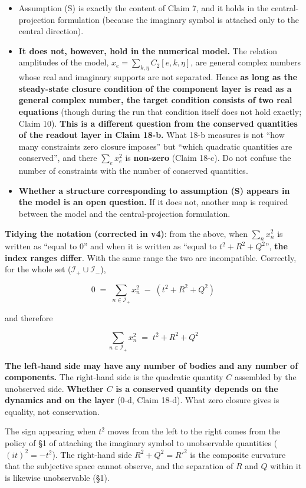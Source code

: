 \documentclass[
  10pt,
]{article}
\providecommand{\tightlist}{%
  \setlength{\itemsep}{0pt}\setlength{\parskip}{0pt}}
\begin{document}
\begin{itemize}
\tightlist
\item
  Assumption (S) is exactly the content of Claim 7, and it holds in the
  central-projection formulation (because the imaginary symbol is
  attached only to the central direction).
\item
  \textbf{It does not, however, hold in the numerical model.} The
  relation amplitudes of the model,
  \(x_e = \sum_{k,\eta}C_{2}[e,k,\eta]\), are general complex numbers
  whose real and imaginary supports are not separated. Hence \textbf{as
  long as the steady-state closure condition of the component layer is
  read as a general complex number, the target condition consists of two
  real equations} (though during the run that condition itself does not
  hold exactly; Claim 10). \textbf{This is a different question from the
  conserved quantities of the readout layer in Claim 18-b.} What 18-b
  measures is not ``how many constraints zero closure imposes'' but
  ``which quadratic quantities are conserved'', and there
  \(\sum_e x_e^2\) is \textbf{non-zero} (Claim 18-c). Do not confuse the
  number of constraints with the number of conserved quantities.
\item
  \textbf{Whether a structure corresponding to assumption (S) appears in
  the model is an open question.} If it does not, another map is
  required between the model and the central-projection formulation.
\end{itemize}

\textbf{Tidying the notation (corrected in v4)}: from the above, when
\(\sum_n x_n^2\) is written as ``equal to \(0\)'' and when it is written
as ``equal to \(t^2+R^2+Q^2\)'', \textbf{the index ranges differ}. With
the same range the two are incompatible. Correctly, for the whole set
(\(\mathcal{I}_+ \cup \mathcal{I}_-\)),

\[0 \;=\; \sum_{n \in \mathcal{I}_+}x_n^2 \;-\; \left(t^2 + R^2 + Q^2\right)\]

and therefore

\[\boxed{\;\sum_{n \in \mathcal{I}_+} x_n^2 \;=\; t^2 + R^2 + Q^2\;}\]

\textbf{The left-hand side may have any number of bodies and any number
of components.} The right-hand side is the quadratic quantity \(C\)
assembled by the unobserved side. \textbf{Whether \(C\) is a conserved
quantity depends on the dynamics and on the layer} (0-d, Claim 18-d).
What zero closure gives is equality, not conservation.

The sign appearing when \(t^2\) moves from the left to the right comes
from the policy of §1 of attaching the imaginary symbol to unobservable
quantities (\((it)^2 = -t^2\)). The right-hand side \(R^2 + Q^2 = R'^2\)
is the composite curvature that the subjective space cannot observe, and
the separation of \(R\) and \(Q\) within it is likewise unobservable
(§1).
\end{document}
